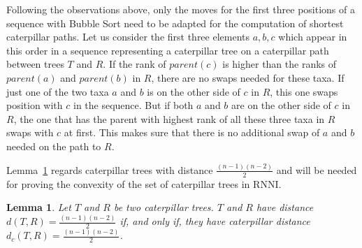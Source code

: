 \documentclass[11pt, a4paper]{article}
\newcommand{\rnni}{\mathrm{RNNI}}
\newtheorem{lemma}[definition]{Lemma}
\begin{document}
Following the observations above, only the moves for the first three positions of a sequence with Bubble Sort need to be adapted for the computation of shortest caterpillar paths.
Let us consider the first three elements $a,b,c$ which appear in this order in a sequence representing a caterpillar tree on a caterpillar path between trees $T$ and $R$.
If the rank of $parent(c)$ is higher than the ranks of $parent(a)$ and $parent(b)$ in $R$, there are no swaps needed for these taxa.
If just one of the two taxa $a$ and $b$ is on the other side of $c$ in $R$, this one swaps position with $c$ in the sequence.
But if both $a$ and $b$ are on the other side of $c$ in $R$, the one that has the parent with highest rank of all these three taxa in $R$ swaps with $c$ at first.
This makes sure that there is no additional swap of $a$ and $b$ needed on the path to $R$.

Lemma~\ref{lemma:caterpillar_dist=diameter} regards caterpillar trees with distance $\frac{(n-1)(n-2)}{2}$ and will be needed for proving the convexity of the set of caterpillar trees in $\rnni$.

\begin{lemma}
    Let $T$ and $R$ be two caterpillar trees.
    $T$ and $R$ have distance $d(T,R) = \frac{(n-1)(n-2)}{2}$ if, and only if, they have caterpillar distance $d_c(T,R) = \frac{(n-1)(n-2)}{2}$.
    \label{lemma:caterpillar_dist=diameter}
\end{lemma}
\end{document}
